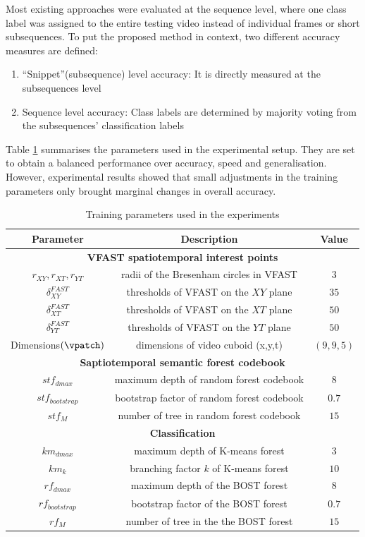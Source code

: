 Most existing approaches were evaluated at the sequence level, where one class label was assigned to the entire testing video instead of individual frames or short subsequences. 
To put the proposed method in context, two different accuracy measures are defined: 
\begin{enumerate}
\item ``Snippet''(subsequence) level accuracy: It is directly measured at the subsequences level 
\item Sequence level accuracy: Class labels are determined by majority voting from the subsequences' classification labels 
\end{enumerate}

Table \ref{tab/act/exparam} summarises the parameters used in the experimental setup. They are set to obtain a balanced performance over accuracy, speed and generalisation. However, experimental results showed that small adjustments in the training parameters only brought marginal changes in overall accuracy. 
\begin{table}
\centering
\begin{tabular}{|c|c|c|}
\hline
\textbf{Parameter} & \textbf{Description} & \textbf{Value} \\
\hline
\multicolumn{3}{|c|}{\textbf{VFAST spatiotemporal interest points}}\\
\hline
$r_{XY}, r_{XT}, r_{YT}$ & radii of the Bresenham circles in VFAST & $3$ \\
$\delta^{FAST}_{XY}$ & thresholds of VFAST on the $XY$ plane& $35$\\
$\delta^{FAST}_{XT}$ & thresholds of VFAST on the $XT$ plane& $50$\\
$\delta^{FAST}_{YT}$ & thresholds of VFAST on the $YT$ plane& $50$\\
Dimensions$(\vpatch)$ & dimensions of video cuboid (x,y,t)& $(9,9,5)$ \\
\hline
\multicolumn{3}{|c|}{\textbf{Saptiotemporal semantic forest codebook}}\\
\hline
$stf_{dmax}$ & maximum depth of random forest codebook & $8$ \\
$stf_{bootstrap}$ & bootstrap factor of random forest codebook & $0.7$ \\
$stf_M$ & number of tree in random forest codebook & $15$ \\
\hline
\multicolumn{3}{|c|}{\textbf{Classification}} \\
\hline
$km_{dmax}$ & maximum depth of K-means forest & $3$ \\
$km_k$ & branching factor $k$ of K-means forest & $10$ \\
$rf_{dmax}$ & maximum depth of the BOST forest & $8$ \\
$rf_{bootstrap}$ & bootstrap factor of the BOST forest& $0.7$ \\
$rf_M$ & number of tree in the the BOST forest& $15$ \\ 
\hline
\end{tabular}
\caption{Training parameters used in the experiments}
\label{tab/act/exparam}
\end{table}


